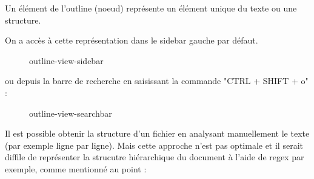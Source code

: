 \documentclass[
    iict, %
    il, %
]{heig-tb}
\begin{document}
Un élément de l'outline (noeud) représente un élément unique du texte ou une structure.

On a accès à cette représentation dans le sidebar gauche par défaut.

\begin{figure}[!h]
    \begin{center}
    \end{center}
    \caption[outline-view-sidebar]{\label{outline-view-sidebar} outline-view-sidebar}
\end{figure}

ou depuis la barre de recherche en saisissant la commande "CTRL + SHIFT + o" :

\begin{figure}[!h]
    \begin{center}
    \end{center}
    \caption[outline-view-searchbar]{\label{outline-view-searchbar} outline-view-searchbar}
\end{figure}

Il est possible obtenir la structure d'un fichier en analysant manuellement le texte (par exemple ligne par ligne).
Mais cette approche n'est pas optimale et il serait diffile de représenter la strucutre hiérarchique du document à l'aide de regex par exemple,
comme mentionné au point : %
\end{document}
